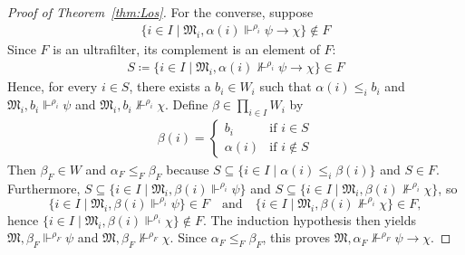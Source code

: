 \documentclass[10pt,a4paper]{amsart}
\newcommand{\mo}{\mathfrak}
\newcommand{\notsatisfy}[4]{#1, #2 \not\Vdash^{#4} #3}
\newcommand{\satisfySym}{\Vdash}
\newcommand{\satisfy}[4]{#1, #2 \satisfySym^{#4} #3}
\begin{document}
\begin{proof}[Proof of Theorem~\ref{thm:Los}]
    For the converse, suppose 
    \begin{align*}
      \{ i \in I \mid \satisfy{\mo{M}_i}{\alpha(i)}{\psi\to\chi}{\rho_i} \} \notin F
    \end{align*}
    Since $F$ is an ultrafilter, its complement is an element of $F$:
    \begin{align*}
      S \coloneq \{ i \in I \mid \notsatisfy{\mo{M}_i}{\alpha(i)}{\psi\to\chi}{\rho_i} \} \in F
    \end{align*}
    Hence, for every $i \in S$, there exists a $b_i \in W_i$ such that
    $\alpha(i) \leq_i b_i$ and $\satisfy{\mo{M}_i}{b_i}{\psi}{\rho_i}$
    and $\notsatisfy{\mo{M}_i}{b_i}{\chi}{\rho_i}$.
    Define $\beta \in \prod_{i \in I} W_i$ by
    \begin{align*}
      \beta(i)
        = \begin{cases}
            b_i &\text{if } i \in S \\
            \alpha(i) &\text{if } i \notin S
          \end{cases}
    \end{align*}
    Then $\beta_F \in W$ and $\alpha_F \leq_F \beta_F$
    because $S \subseteq \{ i \in I \mid \alpha(i) \leq_i \beta(i) \}$ and $S \in F$.
    Furthermore,
    $S \subseteq \{ i \in I \mid \satisfy{\mo{M}_i}{\beta(i)}{\psi}{\rho_i} \}$
    and $S \subseteq \{ i \in I \mid \notsatisfy{\mo{M}_i}{\beta(i)}{\chi}{\rho_i} \}$, 
    so
    \begin{equation*}
      \{ i \in I \mid \satisfy{\mo{M}_i}{\beta(i)}{\psi}{\rho_i} \} \in F
      \quad\text{and}\quad
      \{ i \in I \mid \notsatisfy{\mo{M}_i}{\beta(i)}{\chi}{\rho_i} \} \in F,
    \end{equation*}
    hence $\{ i \in I \mid \satisfy{\mo{M}_i}{\beta(i)}{\chi}{\rho_i} \} \notin F$.
    The induction hypothesis then yields $\satisfy{\mo{M}}{\beta_F}{\psi}{\rho_F}$
    and $\notsatisfy{\mo{M}}{\beta_F}{\chi}{\rho_F}$.
    Since $\alpha_F \leq_F \beta_F$, this proves
    $\notsatisfy{\mo{M}}{\alpha_F}{\psi\to\chi}{\rho_F}$.


\end{proof}
\end{document}
